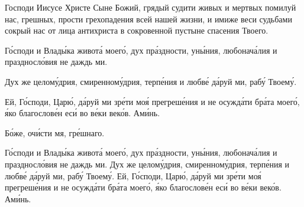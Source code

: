 \mychapterending




Господи Иисусе Христе Сыне Божий, грядый судити живых и мертвых помилуй нас, грешных, прости грехопадения всей нашей жизни, и имиже веси судьбами сокрый нас от лица антихриста в сокровенной пустыне спасения Твоего.

\begin{mymulticols}


Г\'{о}споди и Влад\'{ы}ка живот\'{а} моег\'{о}, дух пр\'{а}здности, ун\'{ы}ния, любонач\'{а}лия и праздносл\'{о}вия не даждь ми. 

Дух же целом\'{у}дрия, смиренном\'{у}дрия, терп\'{е}ния и любв\'{е} д\'{а}руй ми, раб\'{у} Твоем\'{у}. 

Ей, Г\'{о}споди, Цар\'{ю}, д\'{а}руй ми зр\'{е}ти мо\'{я} прегреш\'{е}ния и не осужд\'{а}ти бр\'{а}та моег\'{о}, \'{я}ко благослов\'{е}н ес\'{и} во в\'{е}ки век\'{о}в. Ам\'{и}нь. 

Б\'{о}же, оч\'{и}сти мя, гр\'{е}шнаго. 


Г\'{о}споди и Влад\'{ы}ка живот\'{а} моег\'{о}, дух пр\'{а}здности, ун\'{ы}ния, любонач\'{а}лия и праздносл\'{о}вия не даждь ми. Дух же целом\'{у}дрия, смиренном\'{у}дрия, терп\'{е}ния и любв\'{е} д\'{а}руй ми, раб\'{у} Твоем\'{у}. Ей, Г\'{о}споди, Цар\'{ю}, д\'{а}руй ми зр\'{е}ти мо\'{я} прегреш\'{е}ния и не осужд\'{а}ти бр\'{а}та моег\'{о}, \'{я}ко благослов\'{е}н ес\'{и} во в\'{е}ки век\'{о}в. Ам\'{и}нь. 

\end{mymulticols}

\mychapterending

